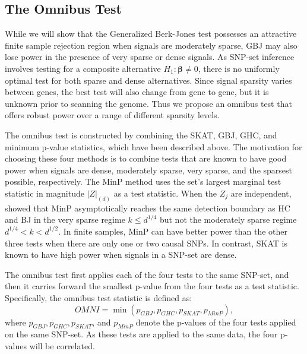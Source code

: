 \documentclass[12pt]{article}
\begin{document}
\subsection{The Omnibus Test}
\label{p2_ss:omnibus}


While we will show that the Generalized Berk-Jones test possesses an attractive finite sample
rejection region when signals are moderately sparse, GBJ may also lose power in the presence 
of very sparse or dense signals.  
As SNP-set inference involves testing for a composite alternative $H_1:\boldsymbol{\beta} \neq 0$, 
there is no uniformly optimal test for both sparse and dense alternatives. 
Since signal sparsity varies between genes, the best test will also change from gene to gene, but it is unknown prior to 
scanning the genome.  
Thus we propose an omnibus test that offers robust power over a range of 
different sparsity levels.


The omnibus test is constructed by combining the SKAT, GBJ, GHC, 
and minimum p-value statistics, which have been described above. 
The motivation for choosing these four methods is to combine tests that are known 
to have good power  when signals are dense, moderately sparse, very sparse, 
and the sparsest possible, respectively.  
The MinP method uses the set's largest marginal test statistic in magnitude $|Z|_{(d)}$ 
as a test statistic. 
When the $Z_{j}$ are independent, \citet{HC} showed that MinP asymptotically 
reaches the same detection boundary as HC and BJ in the very sparse regime 
$k \leq d^{1/4}$ but not the moderately sparse regime $d^{1/4}<k<d^{1/2}$.
In finite samples, MinP can have better power than the other three tests when there 
are only one or two causal SNPs.
In contrast, SKAT is known to have high power when signals in a SNP-set are dense.

The omnibus test first applies each of the four tests to the same SNP-set, and then it 
carries forward the smallest p-value from the four tests as a test statistic. 
Specifically, the omnibus test statistic is defined as: 
\[
OMNI=\min\left(p_{GBJ},p_{GHC},p_{SKAT},p_{MinP}\right ),
\]
where $p_{GBJ}, p_{GHC}, p_{SKAT}$, and $p_{MinP}$  denote the p-values of the four 
tests applied on the same SNP-set.
As these tests are applied to the same data, the four p-values will be correlated.
\end{document}
